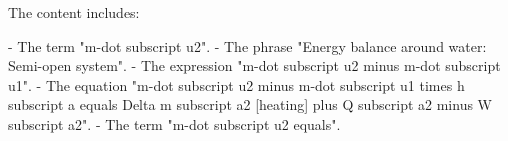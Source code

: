 The content includes:

- The term "m-dot subscript u2".
- The phrase "Energy balance around water: Semi-open system".
- The expression "m-dot subscript u2 minus m-dot subscript u1".
- The equation "m-dot subscript u2 minus m-dot subscript u1 times h subscript a equals Delta m subscript a2 [heating] plus Q subscript a2 minus W subscript a2".
- The term "m-dot subscript u2 equals".